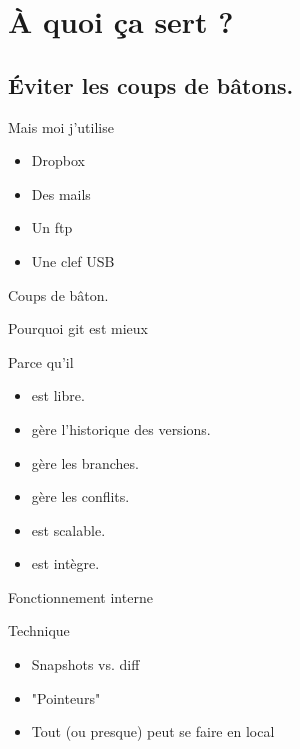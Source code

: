 \documentclass[xcolor=svgnames,12pt]{beamer}
\begin{document}
\section{À quoi ça sert ?}
\subsection{Éviter les coups de bâtons.}

\begin{frame}{Mais moi j'utilise}
    \begin{itemize}
        \item Dropbox
        \item Des mails
        \item Un ftp
        \item Une clef USB
    \end{itemize}
    \pause
    \hspace{1cm}
    \begin{center}
        \huge Coups de bâton.
    \end{center}
\end{frame}

\begin{frame}{Pourquoi git est mieux}
    \begin{block}{Parce qu'il}
        \begin{itemize}
            \item est libre.
            \item gère l'historique des versions.
            \item gère les branches.
            \item gère les conflits.
            \item est scalable.
            \item est intègre.
        \end{itemize}
    \end{block}
\end{frame}

\begin{frame}{Fonctionnement interne}
    \begin{block}{Technique}
        \begin{itemize}
            \item Snapshots vs. diff
            \item "Pointeurs"
            \item Tout (ou presque) peut se faire en local
        \end{itemize}
    \end{block}
\end{frame}
\end{document}
